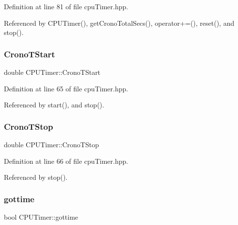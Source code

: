 Definition at line 81 of file cpu\+Timer.\+hpp.



Referenced by C\+P\+U\+Timer(), get\+Crono\+Total\+Secs(), operator+=(), reset(), and stop().

\mbox{\label{class_c_p_u_timer_a097a928f647be3a1e679d702a74119ed}} 
\subsubsection{\texorpdfstring{Crono\+T\+Start}{CronoTStart}}
{\footnotesize\ttfamily double C\+P\+U\+Timer\+::\+Crono\+T\+Start\hspace{0.3cm}{\ttfamily [private]}}



Definition at line 65 of file cpu\+Timer.\+hpp.



Referenced by start(), and stop().

\mbox{\label{class_c_p_u_timer_aaeaf8c0445112562f3b85ad93994d194}} 
\subsubsection{\texorpdfstring{Crono\+T\+Stop}{CronoTStop}}
{\footnotesize\ttfamily double C\+P\+U\+Timer\+::\+Crono\+T\+Stop\hspace{0.3cm}{\ttfamily [private]}}



Definition at line 66 of file cpu\+Timer.\+hpp.



Referenced by stop().

\mbox{\label{class_c_p_u_timer_ab0f086c04c1b6019db26c44db9812d80}} 
\subsubsection{\texorpdfstring{gottime}{gottime}}
{\footnotesize\ttfamily bool C\+P\+U\+Timer\+::gottime\hspace{0.3cm}{\ttfamily [private]}}



